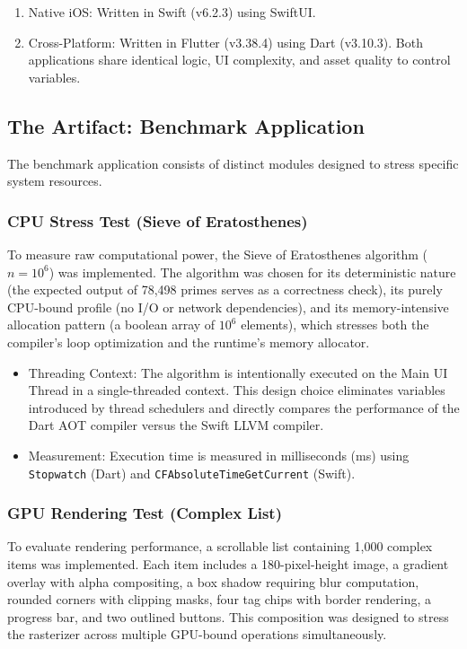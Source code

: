 \documentclass[journal]{IEEEtran}
\begin{document}
\begin{enumerate}
	\item Native iOS: Written in Swift (v6.2.3) using SwiftUI.
	\item Cross-Platform: Written in Flutter (v3.38.4) using Dart (v3.10.3). Both applications share identical
	      logic, UI complexity, and asset quality to control variables.
\end{enumerate}

\subsection{The Artifact: Benchmark Application}
The benchmark application consists of distinct modules designed to stress specific system resources.

\subsubsection{CPU Stress Test (Sieve of Eratosthenes)}
To measure raw computational power, the Sieve of Eratosthenes algorithm ($n = 10^6$) was implemented.
The algorithm was chosen for its deterministic nature (the expected output of 78,498 primes serves as a correctness check), its purely CPU-bound profile (no I/O or network dependencies), and its memory-intensive allocation pattern (a boolean array of $10^6$ elements), which stresses both the compiler's loop optimization and the runtime's memory allocator.

\begin{itemize}
	\item Threading Context: The algorithm is intentionally executed on the Main UI Thread in a
	      single-threaded context. This design choice eliminates variables introduced by thread schedulers and
	      directly compares the performance of the Dart AOT compiler versus the Swift LLVM compiler.
	\item Measurement: Execution time is measured in milliseconds (ms) using \texttt{Stopwatch} (Dart) and \texttt{CFAbsolute\-Time\-Get\-Current} (Swift).
\end{itemize}

\subsubsection{GPU Rendering Test (Complex List)}
To evaluate rendering performance, a scrollable list containing 1,000 complex items was implemented. Each
item includes a 180-pixel-height image, a gradient overlay with alpha compositing, a box shadow requiring blur computation, rounded corners with clipping masks, four tag chips with border rendering, a progress bar, and two outlined buttons. This composition was designed to stress the rasterizer across multiple GPU-bound operations simultaneously.
\end{document}
